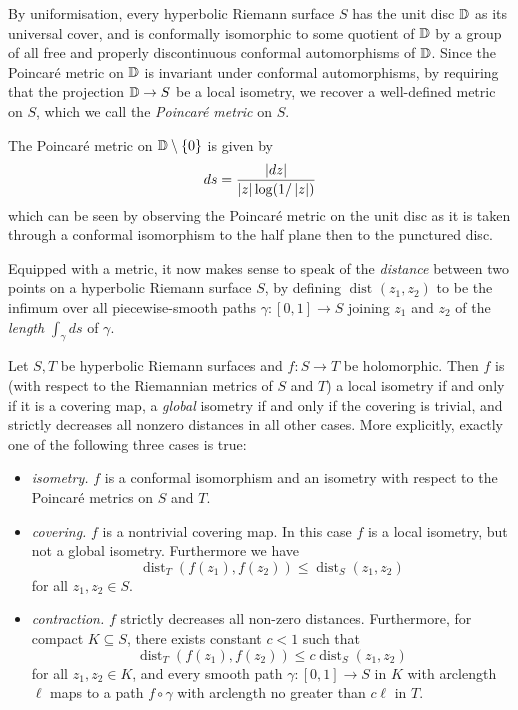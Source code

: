 \documentclass[../main.tex]{subfiles}
\newcommand\dist[3][]{\operatorname{dist}_{#1}({#2}, {#3})}
\begin{document}
By uniformisation, every hyperbolic Riemann surface $S$ has the unit disc $\mathbb{D}$ as its universal cover, and is conformally isomorphic to some quotient of $\mathbb{D}$ by a group of all free and properly discontinuous conformal automorphisms of $\mathbb{D}$. Since the Poincaré metric on $\mathbb{D}$ is invariant under conformal automorphisms, by requiring that the projection $\mathbb{D} \to S$ be a local isometry, we recover a well-defined metric on $S$, which we call the \emph{Poincaré metric} on $S$.


\begin{exl}
The Poincaré metric on $\mathbb{D}\setminus \{0\}$ is given by
\[
ds = \frac{\left|dz\right|}{\left|z\right| \log(1/\left|z\right|)}
\]
which can be seen by observing the Poincaré metric on the unit disc as it is taken through a conformal isomorphism to the half plane then to the punctured disc.
\end{exl}

Equipped with a metric, it now makes sense to speak of the \emph{distance} between two points on a hyperbolic Riemann surface $S$, by defining $\dist{z_1}{z_2}$ to be the infimum over all piecewise-smooth paths $\gamma : [0, 1] \to S$ joining $z_1$ and $z_2$ of the \emph{length} $\int_\gamma ds$ of $\gamma$.

\begin{thm}\label{thm:2.11}
Let $S, T$ be hyperbolic Riemann surfaces and $f: S \to T$ be holomorphic. Then $f$ is (with respect to the Riemannian metrics of $S$ and $T$) a local isometry if and only if it is a covering map, a \emph{global} isometry if and only if the covering is trivial, and strictly decreases all nonzero distances in all other cases. More explicitly, exactly one of the following three cases is true:
\begin{itemize}
    \item \emph{isometry.} $f$ is a conformal isomorphism and an isometry with respect to the Poincaré metrics on $S$ and $T$.
    \item \emph{covering.} $f$ is a nontrivial covering map. In this case $f$ is a local isometry, but not a global isometry. Furthermore we have
    \[
    \dist[T]{f(z_1)}{f(z_2)} \le \dist[S]{z_1}{z_2}
    \]
    for all $z_1, z_2 \in S$.
    \item \emph{contraction.} $f$ strictly decreases all non-zero distances. Furthermore, for compact $K \subseteq S$, there exists constant $c < 1$ such that
    \[
    \dist[T]{f(z_1)}{f(z_2)} \le c\dist[S]{z_1}{z_2}
    \]
    for all $z_1, z_2 \in K$, and every smooth path $\gamma : [0, 1] \to S$ in $K$ with arclength $\ell$ maps to a path $f \circ \gamma$ with arclength no greater than $c\ell$ in $T$.
\end{itemize}
\end{thm}
\end{document}
